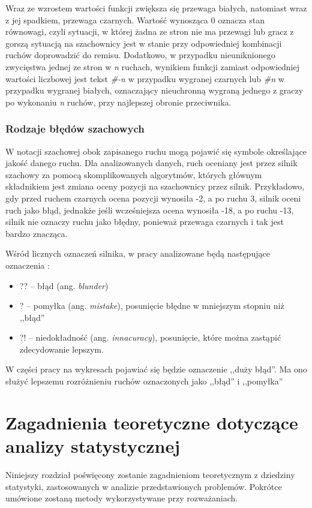 \documentclass[inzynierska]{pwr_wmat_praca_dyplomowa}
\theoremstyle{plain}
\numberwithin{theorem}{chapter}
\theoremstyle{definition}
\numberwithin{theorem}{chapter}
\begin{document}
Wraz ze wzrostem wartości funkcji zwiększa się przewaga białych, natomiast wraz z jej spadkiem, przewaga czarnych. Wartość wynosząca 0 oznacza stan równowagi, czyli sytuacji, w której żadna ze stron nie ma przewagi lub gracz z gorszą sytuacją na szachownicy jest w stanie przy odpowiedniej kombinacji ruchów doprowadzić do remisu. Dodatkowo, w przypadku nieuniknionego zwycięstwa jednej ze stron w \textit{n} ruchach, wynikiem funkcji zamiast odpowiedniej wartości liczbowej jest tekst \textit{\#-n} w przypadku wygranej czarnych lub \textit{\#n} w przypadku wygranej białych, oznaczający nieuchronną wygraną jednego z graczy po wykonaniu \textit{n} ruchów, przy najlepszej obronie przeciwnika.


\subsection{Rodzaje błędów szachowych} \label{sec:mysection}


W notacji szachowej obok zapisanego ruchu mogą pojawić się symbole określające jakość danego ruchu. Dla analizowanych danych, ruch oceniany jest przez silnik szachowy za pomocą skomplikowanych algorytmów, których głównym składnikiem jest zmiana oceny pozycji na szachownicy przez silnik.
Przykładowo, gdy przed ruchem czarnych ocena pozycji wynosiła -2, a po ruchu 3, silnik oceni ruch jako błąd, jednakże jeśli wcześniejsza ocena wynosiła -18, a po ruchu -13, silnik nie oznaczy ruchu jako błędny, ponieważ przewaga czarnych i tak jest bardzo znacząca.

Wśród licznych oznaczeń silnika, w pracy analizowane będą następujące oznaczenia \cite{symbols}:
\begin{itemize}
	\item ??\hphantom{!} -- błąd (ang. \textit{blunder})
	\item ?\hphantom{?!}  -- pomyłka (ang. \textit{mistake}), posunięcie błędne w mniejszym stopniu niż ,,błąd''
	\item ?!\hphantom{?} -- niedokładność  (ang. \textit{innacuracy}), posunięcie, które można zastąpić zdecydowanie lepszym.
\end{itemize}
W części pracy na wykresach pojawiać się będzie oznaczenie ,,duży błąd''. Ma ono służyć lepszemu rozróżnieniu ruchów oznaczonych jako ,,błąd'' i ,,pomyłka''



\chapter{Zagadnienia teoretyczne dotyczące analizy statystycznej}\label{teoria}
Niniejszy rozdział poświęcony zostanie zagadnieniom teoretycznym z dziedziny statystyki, zastosowanych w analizie przedstawionych problemów. Pokrótce umówione zostaną metody wykorzystywane przy rozważaniach. %
\end{document}
